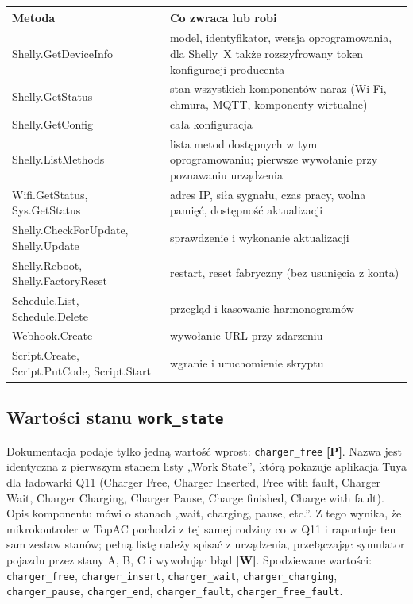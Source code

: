 \documentclass[11pt,a4paper]{article}
\newcommand{\tagP}{\textcolor{apgreen}{\textbf{[P]}}}
\newcommand{\tagW}{\textcolor{apamber}{\textbf{[W]}}}
\newcommand{\code}[1]{\texttt{#1}}
\begin{document}
\begin{tabularx}{\textwidth}{>{\ttfamily}p{5cm}X}
\toprule
\textrm{\textbf{Metoda}} & \textbf{Co zwraca lub robi} \\
\midrule
Shelly.GetDeviceInfo & model, identyfikator, wersja oprogramowania, dla Shelly~X także rozszyfrowany token konfiguracji producenta \\
Shelly.GetStatus & stan wszystkich komponentów naraz (Wi-Fi, chmura, MQTT, komponenty wirtualne) \\
Shelly.GetConfig & cała konfiguracja \\
Shelly.ListMethods & lista metod dostępnych w tym oprogramowaniu; pierwsze wywołanie przy poznawaniu urządzenia \\
Wifi.GetStatus, Sys.GetStatus & adres IP, siła sygnału, czas pracy, wolna pamięć, dostępność aktualizacji \\
Shelly.CheckForUpdate, Shelly.Update & sprawdzenie i wykonanie aktualizacji \\
Shelly.Reboot, Shelly.FactoryReset & restart, reset fabryczny (bez usunięcia z konta) \\
Schedule.List, Schedule.Delete & przegląd i kasowanie harmonogramów \\
Webhook.Create & wywołanie URL przy zdarzeniu \\
Script.Create, Script.PutCode, Script.Start & wgranie i uruchomienie skryptu \\
\bottomrule
\end{tabularx}

\subsection{Wartości stanu \code{work\_state}}

Dokumentacja podaje tylko jedną wartość wprost: \code{charger\_free} \tagP. Nazwa jest identyczna z pierwszym stanem listy „Work State”, którą pokazuje aplikacja Tuya dla ładowarki Q11 (Charger Free, Charger Inserted, Free with fault, Charger Wait, Charger Charging, Charger Pause, Charge finished, Charge with fault). Opis komponentu mówi o stanach „wait, charging, pause, etc.”. Z tego wynika, że mikrokontroler w TopAC pochodzi z tej samej rodziny co w Q11 i raportuje ten sam zestaw stanów; pełną listę należy spisać z urządzenia, przełączając symulator pojazdu przez stany A, B, C i wywołując błąd \tagW. Spodziewane wartości: \code{charger\_free}, \code{charger\_insert}, \code{charger\_wait}, \code{charger\_charging}, \code{charger\_pause}, \code{charger\_end}, \code{charger\_fault}, \code{charger\_free\_fault}.
\end{document}
